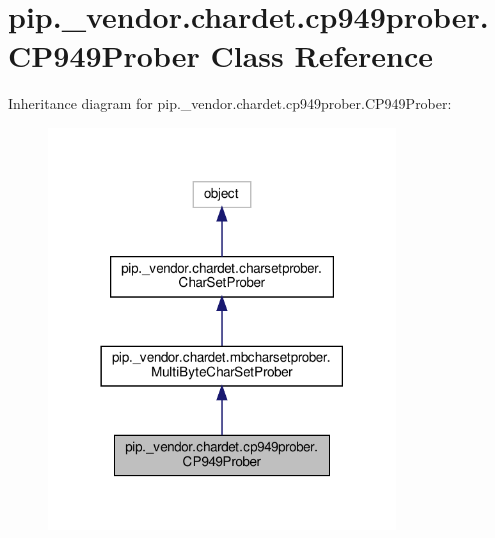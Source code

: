\hypertarget{classpip_1_1__vendor_1_1chardet_1_1cp949prober_1_1CP949Prober}{}\section{pip.\+\_\+vendor.\+chardet.\+cp949prober.\+C\+P949\+Prober Class Reference}
\label{classpip_1_1__vendor_1_1chardet_1_1cp949prober_1_1CP949Prober}


Inheritance diagram for pip.\+\_\+vendor.\+chardet.\+cp949prober.\+C\+P949\+Prober\+:
\nopagebreak
\begin{figure}[H]
\begin{center}
\leavevmode
\includegraphics[width=261pt]{classpip_1_1__vendor_1_1chardet_1_1cp949prober_1_1CP949Prober__inherit__graph}
\end{center}
\end{figure}


